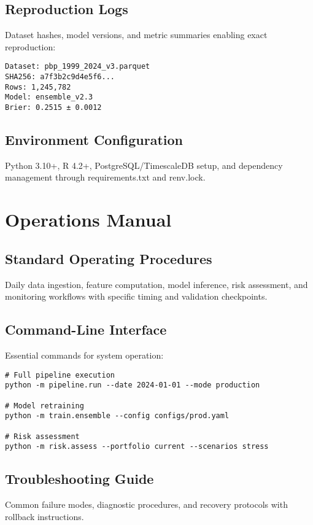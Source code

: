 \documentclass[12pt,letterpaper]{report}
\theoremstyle{definition}
\begin{document}
\section{Reproduction Logs}
Dataset hashes, model versions, and metric summaries enabling exact reproduction:
\begin{verbatim}
Dataset: pbp_1999_2024_v3.parquet
SHA256: a7f3b2c9d4e5f6...
Rows: 1,245,782
Model: ensemble_v2.3
Brier: 0.2515 ± 0.0012
\end{verbatim}

\section{Environment Configuration}
Python 3.10+, R 4.2+, PostgreSQL/TimescaleDB setup, and dependency management through requirements.txt and renv.lock.

\chapter{Operations Manual}

\section{Standard Operating Procedures}
Daily data ingestion, feature computation, model inference, risk assessment, and monitoring workflows with specific timing and validation checkpoints.

\section{Command-Line Interface}
Essential commands for system operation:
\begin{verbatim}
# Full pipeline execution
python -m pipeline.run --date 2024-01-01 --mode production

# Model retraining
python -m train.ensemble --config configs/prod.yaml

# Risk assessment
python -m risk.assess --portfolio current --scenarios stress
\end{verbatim}

\section{Troubleshooting Guide}
Common failure modes, diagnostic procedures, and recovery protocols with rollback instructions.
\end{document}
